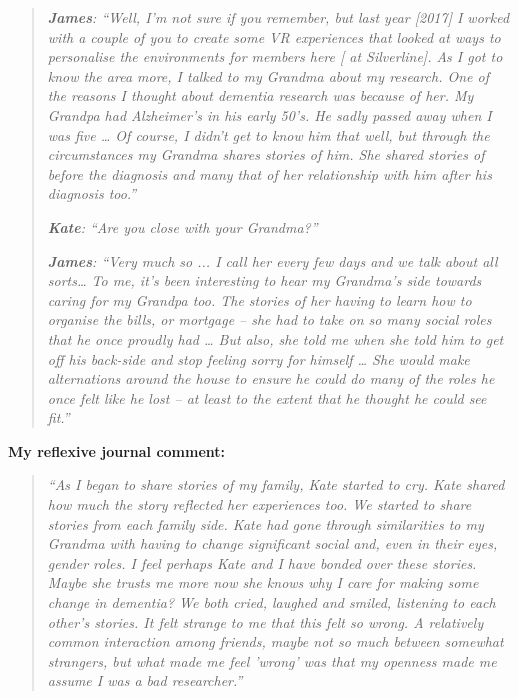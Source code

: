 \begin{quote}
 \textit{   
\textbf{James}: ``Well, I'm not sure if you remember, but last year [2017] I worked with a couple of you to create some VR experiences that looked at ways to personalise the environments for members here [ at Silverline]. As I got to know the area more, I talked to my Grandma about my research. One of the reasons I thought about dementia research was because of her. My Grandpa had Alzheimer's in his early 50's. He sadly passed away when I was five … Of course, I didn't get to know him that well, but through the circumstances my Grandma shares stories of him. She shared stories of before the diagnosis and many that of her relationship with him after his diagnosis too.''}\par


\textit{\textbf{Kate}: ``Are you close with your Grandma?''
}\par


\textit{\textbf{James}: ``Very much so ... I call her every few days and we talk about all sorts… To me, it's been interesting to hear my Grandma's side towards caring for my Grandpa too. The stories of her having to learn how to organise the bills, or mortgage – she had to take on so many social roles that he once proudly had … But also, she told me when she told him to get off his back-side and stop feeling sorry for himself … She would make alternations around the house to ensure he could do many of the roles he once felt like he lost – at least to the extent that he thought he could see fit.''}
\end{quote}

\textbf{My reflexive journal comment: 
}
\begin{quote}
\textit{``As I began to share stories of my family, Kate started to cry. Kate shared how much the story reflected her experiences too. We started to share stories from each family side. Kate had gone through similarities to my Grandma with having to change significant social and, even in their eyes, gender roles. I feel perhaps Kate and I have bonded over these stories. Maybe she trusts me more now she knows why I care for making some change in dementia? We both cried, laughed and smiled, listening to each other's stories. It felt strange to me that this felt so wrong. A relatively common interaction among friends, maybe not so much between somewhat strangers, but what made me feel 'wrong' was that my openness made me assume I was a bad researcher.''}
\end{quote}

